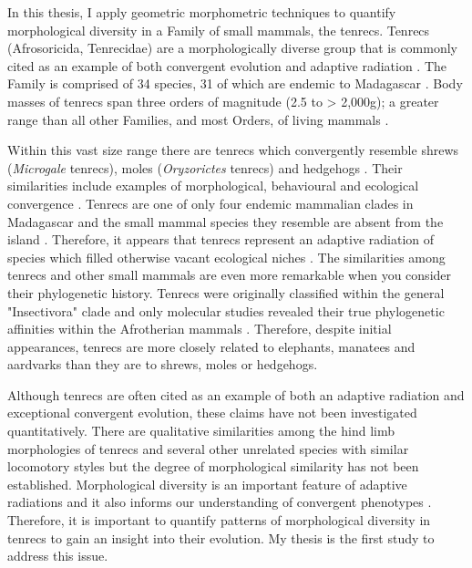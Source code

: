 	
	In this thesis, I apply geometric morphometric techniques to quantify morphological diversity in a Family of small mammals, the tenrecs. Tenrecs (Afrosoricida, Tenrecidae) are a morphologically diverse group that is commonly cited as an example of both convergent evolution and adaptive radiation \citep{Soarimalala2011, Eisenberg1969}. The Family is comprised of 34 species, 31 of which are endemic to Madagascar \citep{Olson2013}. Body masses of tenrecs span three orders of magnitude (2.5 to > 2,000g); a greater range than all other Families, and most Orders, of living mammals \citep{Olson2003}.
	
	Within this vast size range there are tenrecs which convergently resemble shrews (\textit{Microgale} tenrecs), moles (\textit{Oryzorictes} tenrecs) and hedgehogs \citep[\textit{Echinops} and \textit{Setifer} tenrecs,][]{Eisenberg1969}. Their similarities include examples of morphological, behavioural and ecological convergence \citep{Soarimalala2011}. Tenrecs are one of only four endemic mammalian clades in Madagascar and the small mammal species they resemble are absent from the island \citep{Garbutt1999}. Therefore, it appears that tenrecs represent an adaptive radiation of species which filled otherwise vacant ecological niches \citep{Soarimalala2011}.
	The similarities among tenrecs and other small mammals are even more remarkable when you consider their phylogenetic history. Tenrecs were originally classified within the general "Insectivora" clade and only molecular studies revealed their true phylogenetic affinities within the Afrotherian mammals \citep{Stanhope1998}. Therefore, despite initial appearances, tenrecs are more closely related to elephants, manatees and aardvarks than they are to shrews, moles or hedgehogs. 
	

	Although tenrecs are often cited as an example of both an adaptive radiation and exceptional convergent evolution, these claims have not been investigated quantitatively. There are qualitative similarities among the hind limb morphologies of tenrecs and several other unrelated species with similar locomotory styles \citep{Salton2009} but the degree of morphological similarity has not been established. Morphological diversity is an important feature of adaptive radiations \citep{Losos2010a} and it also informs our understanding of convergent phenotypes \citep{Muschick2012}. Therefore, it is important to quantify patterns of morphological diversity in tenrecs to gain an insight into their evolution. My thesis is the first study to address this issue. 

